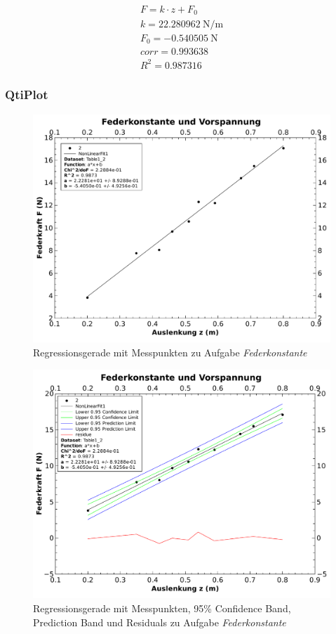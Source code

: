 \begin{gather*}
    F = k \cdot z + F_0 \\
    k = \SI{22.280962}{\newton\per\meter} \\
    F_0 = \SI{-0.540505}{\newton} \\
    corr = 0.993638 \\
    R^2 = 0.987316
\end{gather*}

\subsubsection{QtiPlot}
\begin{figure}[th!]
    \centering
    \includegraphics[width=.8\textwidth]{images/aufgabe3-1.pdf}
    \caption{Regressionsgerade mit Messpunkten zu Aufgabe \emph{Federkonstante}}
    \label{fig:federkonstante1}
\end{figure}
\begin{figure}[th!]
    \centering
    \includegraphics[width=.8\textwidth]{images/aufgabe3-2.pdf}
    \caption{Regressionsgerade mit Messpunkten, 95\% Confidence Band, Prediction Band und Residuals zu Aufgabe \emph{Federkonstante}}
    \label{fig:federkonstante2}
\end{figure}
